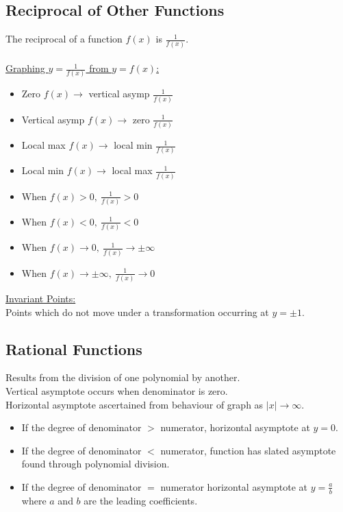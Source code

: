 \documentclass[10pt, a4paper, titlepage]{article}
\begin{document}
\begin{multicols*}{3}
\dotfill
\subsection{Reciprocal of Other Functions}
The reciprocal of a function $f(x)$ is $\frac{1}{f(x)}$.\\\\
\underline{Graphing $y=\frac{1}{f(x)}$ from $y=f(x)$:}
\begin{itemize}
	\item Zero $f(x)\to$ vertical asymp $\frac{1}{f(x)}$
	\item Vertical asymp $f(x)\to$ zero $\frac{1}{f(x)}$
	\item Local max $f(x)\to$ local min $\frac{1}{f(x)}$
	\item Local min $f(x)\to$ local max $\frac{1}{f(x)}$
	\item When $f(x)>0,\ \frac{1}{f(x)}>0$
	\item When $f(x)<0,\ \frac{1}{f(x)}<0$
	\item When $f(x)\to 0,\ \frac{1}{f(x)}\to \pm \infty$
	\item When $f(x)\to \pm \infty,\ \frac{1}{f(x)}\to 0$
\end{itemize}
\underline{Invariant Points:}
\\Points which do not move under a transformation occurring at $y=\pm 1$.

\dotfill
\subsection{Rational Functions}
Results from the division of one polynomial by another.\\
Vertical asymptote occurs when denominator is zero.\\
Horizontal asymptote ascertained from behaviour of graph as $|x|\to \infty$.
\begin{itemize}
	\item If the degree of denominator $>$ numerator, horizontal asymptote at $y=0$.
	\item If the degree of denominator $<$ numerator, function has slated asymptote found through polynomial division.
	\item If the degree of denominator $=$ numerator horizontal asymptote at $y=\frac{a}{b}$ where $a$ and $b$ are the leading coefficients.
\end{itemize}

\dotfill

\end{multicols*}
\end{document}
